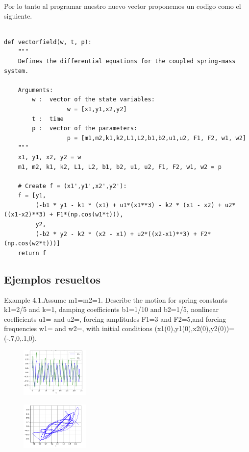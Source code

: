 \documentclass[a4paper]{article}
\begin{document}
Por lo tanto al programar nuestro nuevo vector proponemos un codigo como el siguiente.

\begin{verbatim}

def vectorfield(w, t, p):
    """
    Defines the differential equations for the coupled spring-mass system.

    Arguments:
        w :  vector of the state variables:
                  w = [x1,y1,x2,y2]
        t :  time
        p :  vector of the parameters:
                  p = [m1,m2,k1,k2,L1,L2,b1,b2,u1,u2, F1, F2, w1, w2]
    """
    x1, y1, x2, y2 = w
    m1, m2, k1, k2, L1, L2, b1, b2, u1, u2, F1, F2, w1, w2 = p

    # Create f = (x1',y1',x2',y2'):
    f = [y1,
         (-b1 * y1 - k1 * (x1) + u1*(x1**3) - k2 * (x1 - x2) + u2*((x1-x2)**3) + F1*(np.cos(w1*t))),
         y2,
         (-b2 * y2 - k2 * (x2 - x1) + u2*((x2-x1)**3) + F2*(np.cos(w2*t)))]
    return f

\end{verbatim}

\subsection{Ejemplos resueltos}

Example 4.1.Assume m1=m2=1. Describe the motion for spring constants k1=2/5 and k=1, damping coefficients b1=1/10 and b2=1/5, nonlinear coefficients u1= and u2=, forcing amplitudes F1=3 and F2=5,and  forcing  frequencies w1= and w2=,  with  initial  conditions (x1(0),y1(0),x2(0),y2(0))=(-.7,0,.1,0).

\begin{figure}[ht!]
\centering
\includegraphics[width=0.3\textwidth]{411.png}
\end{figure}

\begin{figure}[ht!]
\centering
\includegraphics[width=0.3\textwidth]{412.png}
\end{figure}
\end{document}
